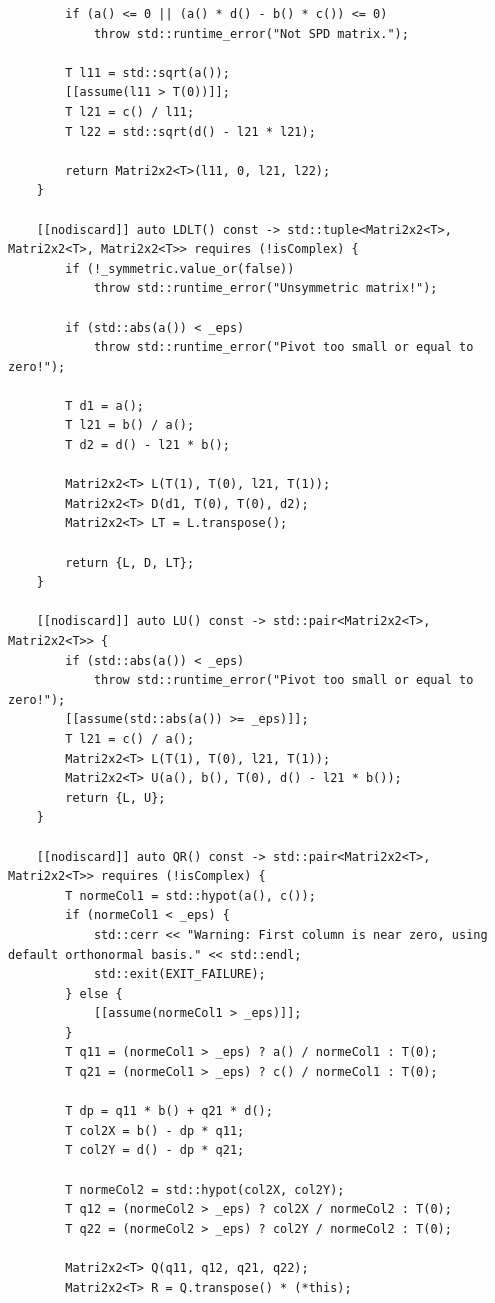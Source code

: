 \documentclass[11pt]{article}
\begin{document}
\begin{lstlisting}
        if (a() <= 0 || (a() * d() - b() * c()) <= 0)
            throw std::runtime_error("Not SPD matrix.");
        
        T l11 = std::sqrt(a());
        [[assume(l11 > T(0))]];
        T l21 = c() / l11;
        T l22 = std::sqrt(d() - l21 * l21);

        return Matri2x2<T>(l11, 0, l21, l22);
    }

    [[nodiscard]] auto LDLT() const -> std::tuple<Matri2x2<T>, Matri2x2<T>, Matri2x2<T>> requires (!isComplex) {
        if (!_symmetric.value_or(false))
            throw std::runtime_error("Unsymmetric matrix!");
        
        if (std::abs(a()) < _eps)
            throw std::runtime_error("Pivot too small or equal to zero!");
        
        T d1 = a();
        T l21 = b() / a();
        T d2 = d() - l21 * b();
        
        Matri2x2<T> L(T(1), T(0), l21, T(1));
        Matri2x2<T> D(d1, T(0), T(0), d2);
        Matri2x2<T> LT = L.transpose();
        
        return {L, D, LT};
    }

    [[nodiscard]] auto LU() const -> std::pair<Matri2x2<T>, Matri2x2<T>> {
        if (std::abs(a()) < _eps)
            throw std::runtime_error("Pivot too small or equal to zero!");
        [[assume(std::abs(a()) >= _eps)]];
        T l21 = c() / a();
        Matri2x2<T> L(T(1), T(0), l21, T(1));
        Matri2x2<T> U(a(), b(), T(0), d() - l21 * b());
        return {L, U};
    }

    [[nodiscard]] auto QR() const -> std::pair<Matri2x2<T>, Matri2x2<T>> requires (!isComplex) {
        T normeCol1 = std::hypot(a(), c());
        if (normeCol1 < _eps) {
            std::cerr << "Warning: First column is near zero, using default orthonormal basis." << std::endl;
            std::exit(EXIT_FAILURE);
        } else {
            [[assume(normeCol1 > _eps)]];
        }
        T q11 = (normeCol1 > _eps) ? a() / normeCol1 : T(0);
        T q21 = (normeCol1 > _eps) ? c() / normeCol1 : T(0);

        T dp = q11 * b() + q21 * d();
        T col2X = b() - dp * q11;
        T col2Y = d() - dp * q21;
        
        T normeCol2 = std::hypot(col2X, col2Y);
        T q12 = (normeCol2 > _eps) ? col2X / normeCol2 : T(0);
        T q22 = (normeCol2 > _eps) ? col2Y / normeCol2 : T(0);
        
        Matri2x2<T> Q(q11, q12, q21, q22);
        Matri2x2<T> R = Q.transpose() * (*this);


\end{lstlisting}
\end{document}
